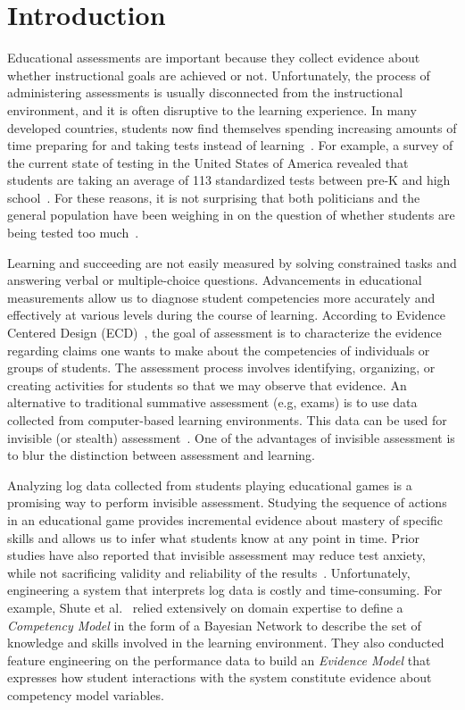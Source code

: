 \documentclass{sigchi}
\begin{document}
	
	\section{Introduction}
	Educational assessments are important because they collect evidence about  whether instructional goals are achieved or not.
	Unfortunately, the process of  administering assessments is usually disconnected from the instructional environment, and  it is often  disruptive to the learning experience. 
	In many developed countries, students now find themselves spending increasing amounts of time preparing for and taking tests instead of learning~\cite{hofman2015re}.
	For example, a  survey of the current state of testing in the United States of America revealed that students are taking an average of 113 standardized tests between pre-K and high school~\cite{lazarin2014testing}. 
	For these reasons, it is not surprising that both politicians and the general population have been weighing in on the question of whether students are being tested too much~\cite{lazarin2014testing}.
	
	Learning and succeeding are not easily measured by solving constrained tasks and answering verbal or multiple-choice questions.
	Advancements in educational  measurements allow us to diagnose student competencies more accurately and effectively at various levels during the course of learning.
	According to Evidence Centered Design (ECD)~\cite{mislevy2012design}, the goal of assessment is to characterize the evidence regarding claims one wants to make about the competencies of individuals or groups of students.
	The assessment process involves identifying, organizing, or creating activities for students so that we may observe that evidence.
	An alternative to traditional summative assessment (e.g, exams) is to use data collected from computer-based learning environments.
	This data can be used for invisible (or stealth) assessment~\cite{shute2013stealth}.
	One of the advantages of invisible assessment is to blur the distinction between assessment and learning.
	
	Analyzing log data collected from students playing educational games is a  promising way to perform invisible assessment.
	Studying the sequence of actions in an educational game provides incremental evidence about mastery of specific skills and allows us to infer what students know at any point in time.
	Prior studies have also reported that invisible assessment may reduce test anxiety, while not sacrificing validity and reliability of the results~\cite{shute2008you}.
	Unfortunately, engineering a system that interprets log data is costly and time-consuming.
	For example, Shute et al.~\cite{shute2013stealth, shute2009melding} relied extensively on domain expertise to define a \textit{Competency Model} in the form of a Bayesian Network to describe the set of knowledge and skills involved in the learning environment.
	They also conducted feature engineering on the performance data to build an \textit{Evidence Model} that expresses how student interactions with the system constitute evidence about competency model variables.
	
\end{document}
